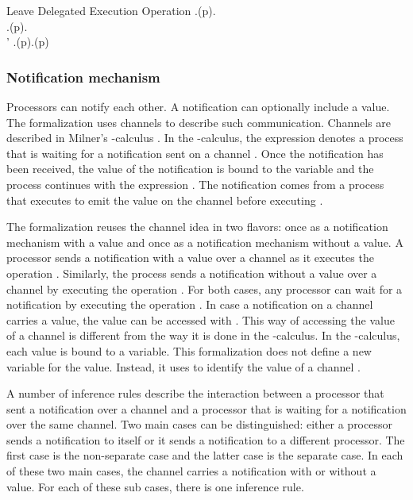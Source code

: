 \singlelineinferencerule
	{Leave Delegated Execution Operation}
	{
		\neg \state.\environmentsfeature(p).\isemptyfeature \\
		\neg \state.\obtainedrequestqueuelocksfeature(p).\isemptyfeature \\
		\state' \mathematicaldefinition \state.\popenvironmentfeature(p).\popobtainedrequestqueuelocksfeature(p)
	}
	{}
	{}
 
\subsubsection{Notification mechanism}\label{sec:notification mechanism}
Processors can notify each other. A notification can optionally include a value. The formalization uses channels to describe such communication. Channels are described in Milner's -calculus \cite{milner:1999:Pi_calculus}. In the -calculus, the expression  denotes a process that is waiting for a notification sent on a channel . Once the notification has been received, the value of the notification is bound to the variable  and the process continues with the expression . The notification comes from a process that executes  to emit the value  on the channel  before executing .

The formalization reuses the channel idea in two flavors: once as a notification mechanism with a value and once as a notification mechanism without a value. A processor sends a notification with a value  over a channel  as it executes the operation . Similarly, the process sends a notification without a value over a channel  by executing the operation . For both cases, any processor can wait for a notification by executing the operation . In case a notification on a channel  carries a value, the value can be accessed with . This way of accessing the value of a channel is different from the way it is done in the -calculus. In the -calculus, each value is bound to a variable. This formalization does not define a new variable for the value. Instead, it uses  to identify the value of a channel .

A number of inference rules describe the interaction between a processor that sent a notification over a channel and a processor that is waiting for a notification over the same channel. Two main cases can be distinguished: either a processor sends a notification to itself or it sends a notification to a different processor. The first case is the non-separate case and the latter case is the separate case. In each of these two main cases, the channel carries a notification with or without a value. For each of these sub cases, there is one inference rule.

